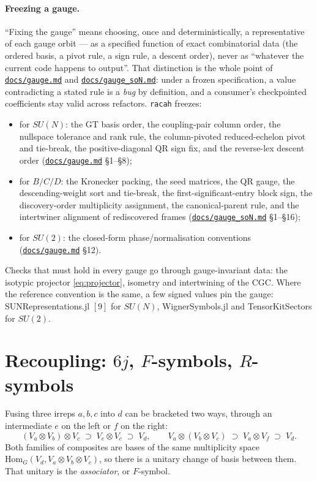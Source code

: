 \documentclass[11pt,a4paper]{article}
\theoremstyle{plain}
\theoremstyle{definition}
\newcommand{\Hom}{\mathrm{Hom}}
\newcommand{\code}[1]{\texttt{#1}}
\newcommand{\gaugemd}{\href{https://github.com/Ryo-wtnb11/fusion-symbols/blob/main/docs/gauge.md}{\code{docs/gauge.md}}}
\newcommand{\gaugeson}{\href{https://github.com/Ryo-wtnb11/fusion-symbols/blob/main/docs/gauge_soN.md}{\code{docs/gauge\_soN.md}}}
\begin{document}
\paragraph{Freezing a gauge.} ``Fixing the gauge'' means choosing, once and
deterministically, a representative of each gauge orbit --- as a specified
function of exact combinatorial data (the ordered basis, a pivot rule, a sign
rule, a descent order), never as ``whatever the current code happens to
output''. That distinction is the whole point of \gaugemd{} and \gaugeson{}:
under a frozen specification, a value contradicting a stated rule is a
\emph{bug} by definition, and a consumer's checkpointed coefficients stay valid
across refactors. \code{racah} freezes:

\begin{itemize}[leftmargin=1.4em]
  \item for $SU(N)$: the GT basis order, the coupling-pair column order, the
    nullspace tolerance and rank rule, the column-pivoted reduced-echelon pivot
    and tie-break, the positive-diagonal QR sign fix, and the reverse-lex
    descent order (\gaugemd{} \S1--\S8);
  \item for $B/C/D$: the Kronecker packing, the seed matrices, the QR gauge,
    the descending-weight sort and tie-break, the first-significant-entry block
    sign, the discovery-order multiplicity assignment, the canonical-parent
    rule, and the intertwiner alignment of rediscovered frames
    (\gaugeson{} \S1--\S16);
  \item for $SU(2)$: the closed-form phase/normalisation conventions
    (\gaugemd{} \S12).
\end{itemize}

Checks that must hold in every gauge go through gauge-invariant data: the
isotypic projector \eqref{eq:projector}, isometry and intertwining of the CGC.
Where the reference convention is the same, a few signed values pin the gauge:
SUNRepresentations.jl $[9]$ for $SU(N)$, WignerSymbols.jl and TensorKitSectors
for $SU(2)$.

\section{Recoupling: $6j$, $F$-symbols, $R$-symbols}
\label{sec:recoupling}

Fusing three irreps $a,b,c$ into $d$ can be bracketed two ways, through an
intermediate $e$ on the left or $f$ on the right:
\[
  (V_a\otimes V_b)\otimes V_c \;\supset\; V_e\otimes V_c \;\supset\; V_d,
  \qquad
  V_a\otimes(V_b\otimes V_c) \;\supset\; V_a\otimes V_f \;\supset\; V_d .
\]
Both families of composites are bases of the same multiplicity space
$\Hom_G(V_d, V_a\otimes V_b\otimes V_c)$, so there is a unitary change of basis
between them. That unitary is the \emph{associator}, or $F$-symbol.
\end{document}

